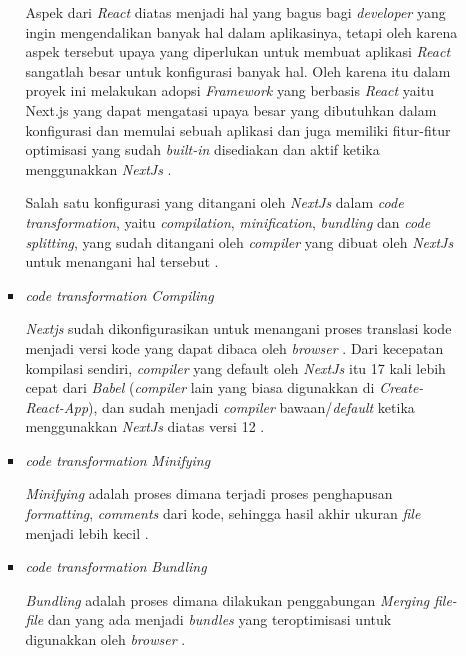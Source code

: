 \documentclass[a4paper]{article}
\begin{document}
\begin{enumerate}[label=\alph*. ]
\begin{enumerate}
\begin{itemize}
	                    Aspek dari \textit{React} diatas menjadi hal yang bagus bagi \textit{developer} yang ingin mengendalikan banyak hal dalam aplikasinya, tetapi oleh karena aspek tersebut upaya yang diperlukan untuk membuat aplikasi \textit{React} sangatlah besar untuk konfigurasi banyak hal. Oleh karena itu dalam proyek ini melakukan adopsi \textit{Framework} yang berbasis \textit{React} yaitu Next.js yang dapat mengatasi upaya besar yang dibutuhkan dalam konfigurasi dan memulai sebuah aplikasi dan juga memiliki fitur-fitur optimisasi yang sudah \textit{built-in} disediakan dan aktif ketika menggunakkan \textit{NextJs} \autocite{Nextjs_general}.

	                    Salah satu konfigurasi yang ditangani oleh \textit{NextJs} dalam \textit{code transformation}, yaitu \textit{compilation}, \textit{minification}, \textit{bundling} dan \textit{code splitting}, yang sudah ditangani oleh \textit{compiler} yang dibuat oleh \textit{NextJs} untuk menangani hal tersebut \autocite{Nextjs_compiler}.

                        \item \textit{code transformation} \textit{Compiling}

                        \textit{Nextjs} sudah dikonfigurasikan untuk menangani proses translasi kode menjadi versi kode yang dapat dibaca oleh \textit{browser} \autocite{Nextjs_compiling}. Dari kecepatan kompilasi sendiri, \textit{compiler} yang default oleh \textit{NextJs} itu 17 kali lebih cepat dari \textit{Babel} (\textit{compiler} lain yang biasa digunakkan di \textit{Create-React-App}), dan sudah menjadi \textit{compiler} bawaan/\textit{default} ketika menggunakkan \textit{NextJs} diatas versi 12 \autocite{Nextjs_depth_compiler}.

                        \item \textit{code transformation} \textit{Minifying}

                        \textit{Minifying} adalah proses dimana terjadi proses penghapusan \textit{formatting}, \textit{comments} dari kode, sehingga hasil akhir ukuran \textit{file} menjadi lebih kecil \autocite{Nextjs_minifiying}.

                        \item \textit{code transformation} \textit{Bundling}

                        \textit{Bundling} adalah proses dimana dilakukan penggabungan \textit{Merging} \textit{file-file} dan yang ada menjadi \textit{bundles} yang teroptimisasi untuk digunakkan oleh \textit{browser} \autocite{Nextjs_bundling}.


\end{itemize}
\end{enumerate}
\end{enumerate}
\end{document}
